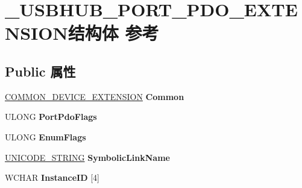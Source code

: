 \hypertarget{struct___u_s_b_h_u_b___p_o_r_t___p_d_o___e_x_t_e_n_s_i_o_n}{}\section{\+\_\+\+U\+S\+B\+H\+U\+B\+\_\+\+P\+O\+R\+T\+\_\+\+P\+D\+O\+\_\+\+E\+X\+T\+E\+N\+S\+I\+O\+N结构体 参考}
\label{struct___u_s_b_h_u_b___p_o_r_t___p_d_o___e_x_t_e_n_s_i_o_n}
\subsection*{Public 属性}
\begin{DoxyCompactItemize}
\item 
\mbox{\label{struct___u_s_b_h_u_b___p_o_r_t___p_d_o___e_x_t_e_n_s_i_o_n_a972f1f2d4d41efda22b193b6b521b007}} 
\hyperlink{struct_c_o_m_m_o_n___d_e_v_i_c_e___e_x_t_e_n_s_i_o_n}{C\+O\+M\+M\+O\+N\+\_\+\+D\+E\+V\+I\+C\+E\+\_\+\+E\+X\+T\+E\+N\+S\+I\+ON} {\bfseries Common}
\item 
\mbox{\label{struct___u_s_b_h_u_b___p_o_r_t___p_d_o___e_x_t_e_n_s_i_o_n_aa31421b6419aea98235e500384ba7697}} 
U\+L\+O\+NG {\bfseries Port\+Pdo\+Flags}
\item 
\mbox{\label{struct___u_s_b_h_u_b___p_o_r_t___p_d_o___e_x_t_e_n_s_i_o_n_a0887cb7c56da515dd9bd7aeecfa7cea0}} 
U\+L\+O\+NG {\bfseries Enum\+Flags}
\item 
\mbox{\label{struct___u_s_b_h_u_b___p_o_r_t___p_d_o___e_x_t_e_n_s_i_o_n_aa1fbf9c1a1b7bc3e745eac9016f883b6}} 
\hyperlink{struct___u_n_i_c_o_d_e___s_t_r_i_n_g}{U\+N\+I\+C\+O\+D\+E\+\_\+\+S\+T\+R\+I\+NG} {\bfseries Symbolic\+Link\+Name}
\item 
\mbox{\label{struct___u_s_b_h_u_b___p_o_r_t___p_d_o___e_x_t_e_n_s_i_o_n_abd8cac9a11646b0e7c91140ca16e1746}} 
W\+C\+H\+AR {\bfseries Instance\+ID} \mbox{[}4\mbox{]}
\item 

\end{DoxyCompactItemize}
